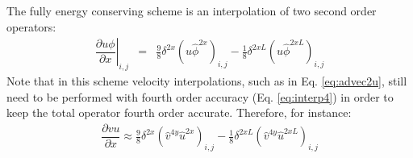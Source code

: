 \documentclass[gmd]{copernicus}
\begin{document}
The fully energy conserving scheme is an interpolation of two second order operators:
\begin{eqnarray}
\left. \dfrac{\partial u \phi}{\partial x} \right|_{i,j} & = & \frac{9}{8} \delta^{2x} \left( u \widehat{\phi}^{2x} \right)_{i,j} 
                                                             - \frac{1}{8} \delta^{2xL} \left( u \widehat{\phi}^{2xL} \right)_{i,j}%
\end{eqnarray}
Note that in this scheme velocity interpolations, such as in Eq. \ref{eq:advec2u}, still need to be performed with fourth order accuracy (Eq. \ref{eq:interp4}) in order to keep the total operator fourth order accurate. Therefore, for instance:
\begin{eqnarray}
\dfrac{\partial v u}{\partial x} \approx \frac{9}{8} \delta^{2x} \left( \widehat{v}^{4y} \widehat{u}^{2x} \right)_{i,j} 
                                       - \frac{1}{8} \delta^{2xL} \left( \widehat{v}^{4y} \widehat{u}^{2xL} \right)_{i,j}
\end{eqnarray}
\end{document}
